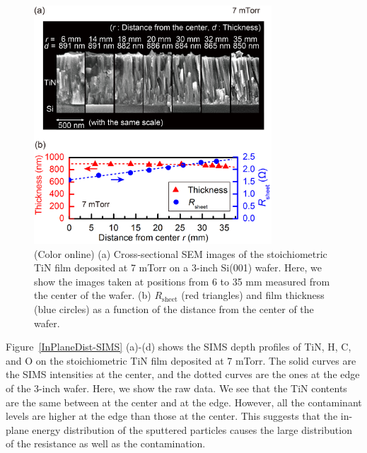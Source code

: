 \begin{figure}
\begin{center}
\includegraphics[width=89mm]{InPlaneDist.jpg}
\end{center}

\caption{(Color online) (a) Cross-sectional SEM images of the stoichiometric TiN film deposited at 7 mTorr on a 3-inch Si(001) wafer. Here, we show the images taken at positions from 6 to 35 mm measured from the center of the wafer. (b) $R$$_{\text{sheet}}$ (red triangles) and film thickness (blue circles) as a function of the distance from the center of the wafer.}
\label{InPlaneDist}
\end{figure}
Figure \,\ref{InPlaneDist-SIMS} (a)-(d) shows the SIMS depth profiles of TiN, H, C, and O on the stoichiometric TiN film deposited at 7 mTorr. The solid curves are the SIMS intensities at the center, and the dotted curves are the ones at the edge of the 3-inch wafer. Here, we show the raw data. We see that the TiN contents are the same between at the center and at the edge. However, all the contaminant levels are higher at the edge than those at the center.  This suggests that the in-plane energy distribution of the sputtered particles causes the large distribution of the resistance as well as the contamination.

